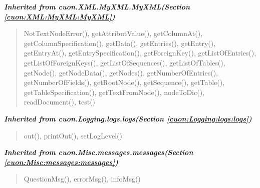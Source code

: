 \large{\textbf{\textit{Inherited from cuon.XML.MyXML.MyXML\textit{(Section \ref{cuon:XML:MyXML:MyXML})}}}}

\begin{quote}
NotTextNodeError(), getAttributValue(), getColumnAt(), getColumnSpecification(), getData(), getEntries(), getEntry(), getEntryAt(), getEntrySpecification(), getForeignKey(), getListOfEntries(), getListOfForeignKeys(), getListOfSequences(), getListOfTables(), getNode(), getNodeData(), getNodes(), getNumberOfEntries(), getNumberOfFields(), getRootNode(), getSequence(), getTable(), getTableSpecification(), getTextFromNode(), nodeToDic(), readDocument(), test()
\end{quote}

\large{\textbf{\textit{Inherited from cuon.Logging.logs.logs\textit{(Section \ref{cuon:Logging:logs:logs})}}}}

\begin{quote}
out(), printOut(), setLogLevel()
\end{quote}

\large{\textbf{\textit{Inherited from cuon.Misc.messages.messages\textit{(Section \ref{cuon:Misc:messages:messages})}}}}

\begin{quote}
QuestionMsg(), errorMsg(), infoMsg()
\end{quote}
